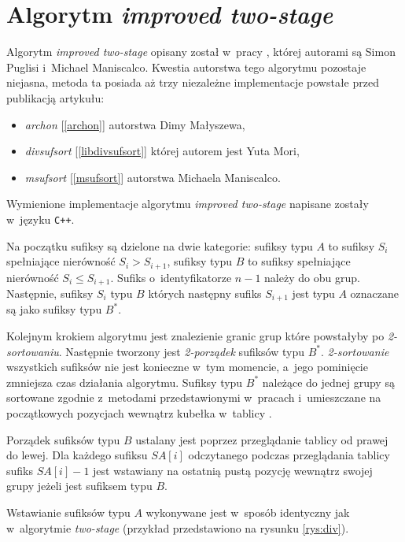 \section{Algorytm \emph{improved two-stage}}

Algorytm \emph{improved two-stage} opisany został w~pracy \cite{MP}, której
autorami są Simon Puglisi i~Michael Maniscalco.
Kwestia autorstwa tego algorytmu pozostaje niejasna, metoda ta posiada aż trzy niezależne
implementacje powstałe przed publikacją artykułu:
\begin{itemize}
	\item \emph{archon } [\ref{archon}] autorstwa Dimy Małyszewa,
	\item \emph{divsufsort} [\ref{libdivsufsort}] której autorem jest Yuta Mori,
	\item \emph{msufsort} [\ref{msufsort}] autorstwa Michaela Maniscalco.
\end{itemize}
Wymienione implementacje algorytmu \emph{improved two-stage} napisane zostały w~języku \texttt{C++}. 

Na początku sufiksy są dzielone na dwie kategorie: sufiksy typu $A$ to sufiksy
$S_i$ spełniające nierówność $S_i > S_{i+1}$, sufiksy typu $B$ to sufiksy
spełniające nierówność $S_i \leq S_{i+1}$. Sufiks o~identyfikatorze $n-1$ należy
do obu grup. Następnie, sufiksy $S_i$ typu $B$ których następny sufiks $S_{i+1}$ jest typu $A$ oznaczane są jako
sufiksy typu $B^*$. 

Kolejnym krokiem algorytmu jest znalezienie granic grup które powstałyby po
\emph{2-sortowaniu}. Następnie tworzony jest \emph{2-porządek} sufiksów typu
$B^*$. \emph{2-sortowanie} wszystkich sufiksów nie jest konieczne w~tym
momencie, a~jego pominięcie zmniejsza czas działania algorytmu.
Sufiksy typu $B^*$ należące do jednej grupy są sortowane zgodnie z~metodami
przedstawionymi w~pracach \cite{bentley, MF} i~umieszczane na początkowych
pozycjach wewnątrz kubełka w~tablicy \SA{}. 

Porządek sufiksów typu $B$ ustalany jest poprzez przeglądanie tablicy \SA{} od
prawej do lewej. Dla każdego sufiksu $\mathit{SA}[i]$ odczytanego podczas
przeglądania tablicy sufiks $\mathit{SA}[i]-1$ jest wstawiany na ostatnią pustą
pozycję wewnątrz swojej grupy jeżeli jest sufiksem typu $B$.

Wstawianie sufiksów typu $A$ wykonywane jest w~sposób identyczny jak w~algorytmie
\emph{two-stage} (przykład przedstawiono na rysunku \ref{rys:div}).

